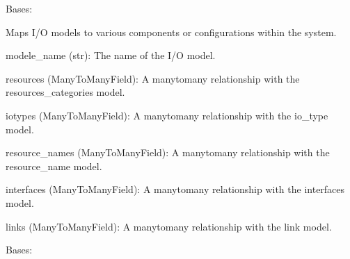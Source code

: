 \documentclass[letterpaper,10pt,english]{sphinxmanual}
\begin{document}

\begin{fulllineitems}
\label{\detokenize{app:app.models.modele_io_mapping}}
\pysigstartsignatures
{}
\pysigstopsignatures
\sphinxAtStartPar
Bases: 

\sphinxAtStartPar
Maps I/O models to various components or configurations within the system.
\begin{description}
\sphinxAtStartPar
modele\_name (str): The name of the I/O model.

\sphinxAtStartPar
resources (ManyToManyField): A many\sphinxhyphen{}to\sphinxhyphen{}many relationship with the resources\_categories model.

\sphinxAtStartPar
iotypes (ManyToManyField): A many\sphinxhyphen{}to\sphinxhyphen{}many relationship with the io\_type model.

\sphinxAtStartPar
resource\_names (ManyToManyField): A many\sphinxhyphen{}to\sphinxhyphen{}many relationship with the resource\_name model.

\sphinxAtStartPar
interfaces (ManyToManyField): A many\sphinxhyphen{}to\sphinxhyphen{}many relationship with the interfaces model.

\sphinxAtStartPar
links (ManyToManyField): A many\sphinxhyphen{}to\sphinxhyphen{}many relationship with the link model.

\end{description}

\begin{fulllineitems}
\label{\detokenize{app:app.models.modele_io_mapping.DoesNotExist}}
\pysigstartsignatures
{}
\pysigstopsignatures
\sphinxAtStartPar
Bases: 

\end{fulllineitems}



\end{fulllineitems}
\end{document}
